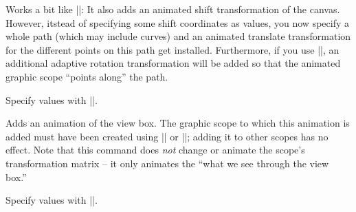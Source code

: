 \begin{command}{\pgfsys@animatemotion}
  Works a bit like |\pgfsys@animation@translate|: It also adds an
  animated shift transformation of the canvas. However, itstead of
  specifying some shift coordinates as values, you now specify a whole
  path (which may include curves) and an animated translate
  transformation for the different points on this path get installed.
  Furthermore, if you use |\pgfsys@animation@rotatealong|, an
  additional adaptive rotation transformation will be added so that
  the animated graphic scope ``points along'' the path.
  
  Specify values with |\pgfsys@animation@movealong|.
\begin{codeexample}[width=2cm]
\end{codeexample}
\end{command}


\begin{command}{\pgfsys@animateviewbox}
  Adds an animation of the view box. The graphic scope to which this
  animation is added must have been created using
  |\pgfsys@viewboxmeet| or |\pgfsys@viewboxslice|; adding it to other
  scopes has no effect. Note   that this command does \emph{not}
  change or animate the scope's transformation matrix -- it only animates the
  ``what we see through the view box.''
  
  Specify values with |\pgfsys@animation@viewbox|.
\begin{codeexample}[width=2.3cm]
\end{codeexample}
\end{command}


